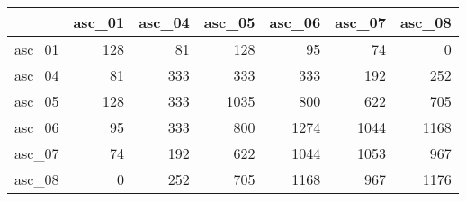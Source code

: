 \begin{tabular}{lrrrrrr}
\toprule
{} &  asc\_01 &  asc\_04 &  asc\_05 &  asc\_06 &  asc\_07 &  asc\_08 \\
\midrule
asc\_01 &     128 &      81 &     128 &      95 &      74 &       0 \\
asc\_04 &      81 &     333 &     333 &     333 &     192 &     252 \\
asc\_05 &     128 &     333 &    1035 &     800 &     622 &     705 \\
asc\_06 &      95 &     333 &     800 &    1274 &    1044 &    1168 \\
asc\_07 &      74 &     192 &     622 &    1044 &    1053 &     967 \\
asc\_08 &       0 &     252 &     705 &    1168 &     967 &    1176 \\
\bottomrule
\end{tabular}
